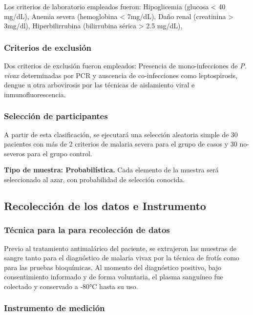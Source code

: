 \documentclass[]{article}
\begin{document}
Los criterios de laboratorio empleados fueron: Hipoglicemia (glucosa
\textless{} 40 mg/dL), Anemia severa (hemoglobina \textless{} 7mg/dL),
Daño renal (creatinina \textgreater{} 3mg/dl), Hiperbilirrubina
(bilirrubina sérica \textgreater{} 2.5 mg/dL),

\subsubsection{Criterios de exclusión}\label{criterios-de-exclusion}

Dos criterios de exclusión fueron empleados: Presencia de
mono-infecciones de \emph{P. vivax} determinadas por PCR y auscencia de
co-infecciones como leptospirosis, dengue u otra arbovirosis por las
técnicas de aislamiento viral e inmunofluorescencia.

\subsubsection{Selección de
participantes}\label{seleccion-de-participantes}

A partir de esta clasificación, se ejecutará una selección aleatoria
simple de 30 pacientes con más de 2 criterios de malaria severa para el
grupo de casos y 30 no-severos para el grupo control.

\textbf{Tipo de muestra: Probabilística.} Cada elemento de la muestra
será seleccionado al azar, con probabilidad de selección conocida.

\subsection{Recolección de los datos e
Instrumento}\label{recoleccion-de-los-datos-e-instrumento}

\subsubsection{Técnica para la para recolección de
datos}\label{tecnica-para-la-para-recoleccion-de-datos}

Previo al tratamiento antimalárico del paciente, se extrajeron las
muestras de sangre tanto para el diagnóstico de malaria vivax por la
técnica de frotís como para las pruebas bioquímicas. Al momento del
diagnóstico positivo, bajo consentimiento informado y de forma
voluntaria, el plasma sanguíneo fue colectado y conservado a -80°C hasta
su uso.

\subsubsection{Instrumento de medición}\label{instrumento-de-medicion}
\end{document}

